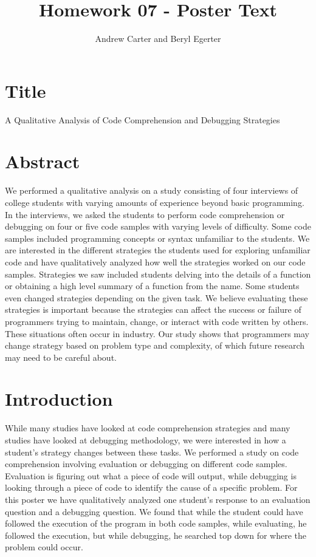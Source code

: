 \documentclass{article}
\title{Homework 07 - Poster Text}
\author{Andrew Carter and Beryl Egerter}
\begin{document}
\maketitle

\section{Title}
A Qualitative Analysis of Code Comprehension and Debugging Strategies

\section{Abstract}
We performed a qualitative analysis on a study consisting of four interviews of college students with varying amounts of experience beyond basic programming. In the interviews, we asked the students to perform code comprehension or debugging on four or five code samples with varying levels of difficulty. Some code samples included programming concepts or syntax unfamiliar to the students. We are interested in the different strategies the students used for exploring unfamiliar code and have qualitatively analyzed how well the strategies worked on our code samples. Strategies we saw included students delving into the details of a function or obtaining a high level summary of a function from the name. Some students even changed strategies depending on the given task. We believe evaluating these strategies is important because the strategies can affect the success or failure of programmers trying to maintain, change, or interact with code written by others. These situations often occur in industry. Our study shows that programmers may change strategy based on problem type and complexity, of which future research may need to be careful about.

\section{Introduction}
While many studies have looked at code comprehension strategies and many studies have looked at debugging methodology, we were interested in how a student's strategy changes between these tasks. We performed a study on code comprehension involving evaluation or debugging on different code samples. Evaluation is figuring out what a piece of code will output, while debugging is looking through a piece of code to identify the cause of a specific problem. For this poster we have qualitatively analyzed one student's response to an evaluation question and a debugging question. We found that while the student could have followed the execution of the program in both code samples, while evaluating, he followed the execution, but while debugging, he searched top down for where the problem could occur.  
\end{document}

